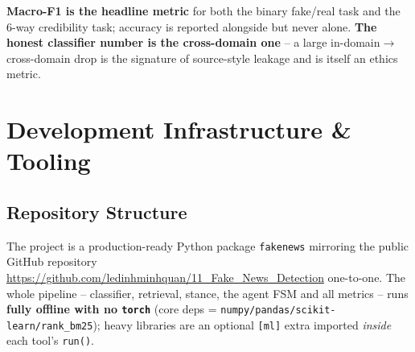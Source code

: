 \documentclass[12pt,a4paper]{article}
\begin{document}
\noindent \textbf{Macro-F1 is the headline metric} for both the binary fake/real task and the 6-way credibility task; accuracy is reported alongside but never alone. \textbf{The honest classifier number is the cross-domain one} -- a large in-domain$\rightarrow$cross-domain drop is the signature of source-style leakage and is itself an ethics metric.

\section{Development Infrastructure \& Tooling}

\subsection{Repository Structure}

The project is a production-ready Python package \texttt{fakenews} mirroring the public GitHub repository \url{https://github.com/ledinhminhquan/11_Fake_News_Detection} one-to-one. The whole pipeline -- classifier, retrieval, stance, the agent FSM and all metrics -- runs \textbf{fully offline with no \texttt{torch}} (core deps = \texttt{numpy/pandas/scikit-learn/rank\_bm25}); heavy libraries are an optional \texttt{[ml]} extra imported \emph{inside} each tool's \texttt{run()}.
\end{document}
